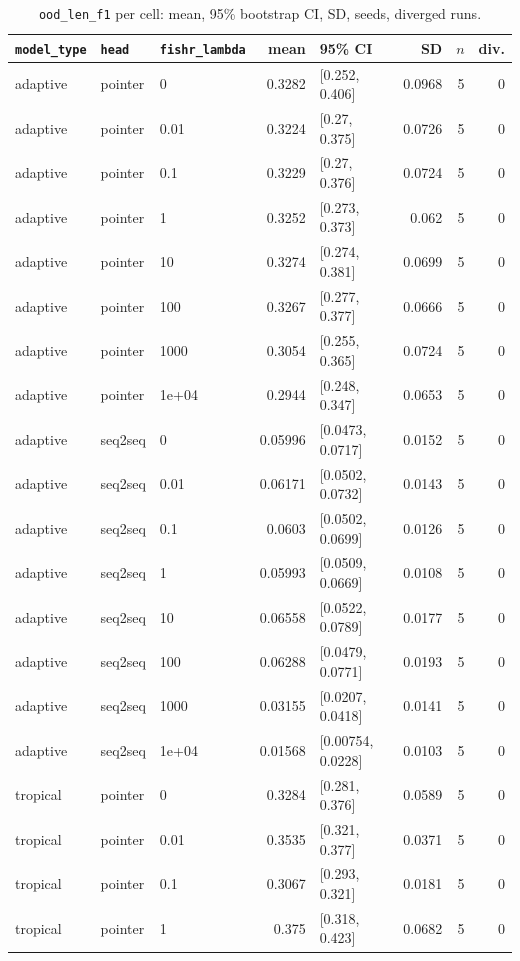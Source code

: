 \documentclass[10pt]{article}
\begin{document}
{\small
\begin{longtable}{lllrlrrr}
\caption{\texttt{ood\_len\_f1} per cell: mean, 95\% bootstrap CI, SD, seeds, diverged runs.}\label{tab:summary-ood_len_f1}\\
\toprule
\texttt{model\_type} & \texttt{head} & \texttt{fishr\_lambda} & mean & 95\% CI & SD & $n$ & div.\\
\midrule
\endhead
adaptive & pointer & 0 & 0.3282 & [0.252, 0.406] & 0.0968 & 5 & 0\\
adaptive & pointer & 0.01 & 0.3224 & [0.27, 0.375] & 0.0726 & 5 & 0\\
adaptive & pointer & 0.1 & 0.3229 & [0.27, 0.376] & 0.0724 & 5 & 0\\
adaptive & pointer & 1 & 0.3252 & [0.273, 0.373] & 0.062 & 5 & 0\\
adaptive & pointer & 10 & 0.3274 & [0.274, 0.381] & 0.0699 & 5 & 0\\
adaptive & pointer & 100 & 0.3267 & [0.277, 0.377] & 0.0666 & 5 & 0\\
adaptive & pointer & 1000 & 0.3054 & [0.255, 0.365] & 0.0724 & 5 & 0\\
adaptive & pointer & 1e+04 & 0.2944 & [0.248, 0.347] & 0.0653 & 5 & 0\\
adaptive & seq2seq & 0 & 0.05996 & [0.0473, 0.0717] & 0.0152 & 5 & 0\\
adaptive & seq2seq & 0.01 & 0.06171 & [0.0502, 0.0732] & 0.0143 & 5 & 0\\
adaptive & seq2seq & 0.1 & 0.0603 & [0.0502, 0.0699] & 0.0126 & 5 & 0\\
adaptive & seq2seq & 1 & 0.05993 & [0.0509, 0.0669] & 0.0108 & 5 & 0\\
adaptive & seq2seq & 10 & 0.06558 & [0.0522, 0.0789] & 0.0177 & 5 & 0\\
adaptive & seq2seq & 100 & 0.06288 & [0.0479, 0.0771] & 0.0193 & 5 & 0\\
adaptive & seq2seq & 1000 & 0.03155 & [0.0207, 0.0418] & 0.0141 & 5 & 0\\
adaptive & seq2seq & 1e+04 & 0.01568 & [0.00754, 0.0228] & 0.0103 & 5 & 0\\
tropical & pointer & 0 & 0.3284 & [0.281, 0.376] & 0.0589 & 5 & 0\\
tropical & pointer & 0.01 & 0.3535 & [0.321, 0.377] & 0.0371 & 5 & 0\\
tropical & pointer & 0.1 & 0.3067 & [0.293, 0.321] & 0.0181 & 5 & 0\\
tropical & pointer & 1 & 0.375 & [0.318, 0.423] & 0.0682 & 5 & 0\\

\end{longtable}}
\end{document}
